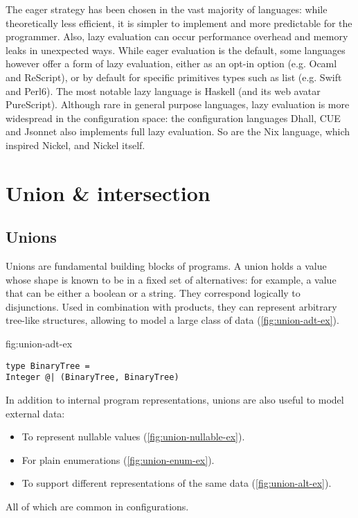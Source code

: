 \documentclass[sigplan,10pt,review,anonymous]{acmart}
\newcommand{\info}[2][1=]{}
\newcommand{\change}[2]{}
\begin{document}
The eager strategy has been chosen in the vast majority of languages: while
theoretically less efficient, it is simpler to implement and more predictable
for the programmer. Also, lazy evaluation can occur performance overhead and
memory leaks in unexpected ways. While eager evaluation is the default, some
languages however offer a form of lazy evaluation, either as an opt-in option
(e.g. Ocaml and ReScript), or by default for specific primitives types such as
list (e.g.  Swift and Perl6). The most notable lazy language is Haskell
(and its web avatar PureScript). Although rare in general purpose languages,
lazy evaluation is more widespread in the configuration space: the configuration
languages Dhall, CUE and Jsonnet also implements full lazy evaluation. So are
the Nix language, which inspired Nickel, and Nickel itself.

\newpage

\section{Union \& intersection}
\label{sec:union-inter}
\info{What are they, what are they used for.}

\subsection*{Unions}
Unions are fundamental building blocks of programs. A union holds a value whose
shape is known to be in a fixed set of alternatives: for example, a value that
can be either a boolean or a string. They correspond logically to disjunctions.
Used in combination with products, they can represent arbitrary tree-like
structures, allowing to model a large class of data
(\ref{fig:union-adt-ex}).


\change{These next few labels need to be inside figures,
they are not working}
\label{fig:union-adt-ex}
\begin{lstlisting}[title={Tree-like data structure}]
type BinaryTree =
Integer @| (BinaryTree, BinaryTree)
\end{lstlisting}


In addition to internal program representations, unions are also useful to model
external data:
\begin{itemize}
    \item To represent nullable values (\ref{fig:union-nullable-ex}).
    \item For plain enumerations (\ref{fig:union-enum-ex}).
    \item To support different representations of the same data
        (\ref{fig:union-alt-ex}).
\end{itemize}
All of which are common in configurations.
\end{document}
